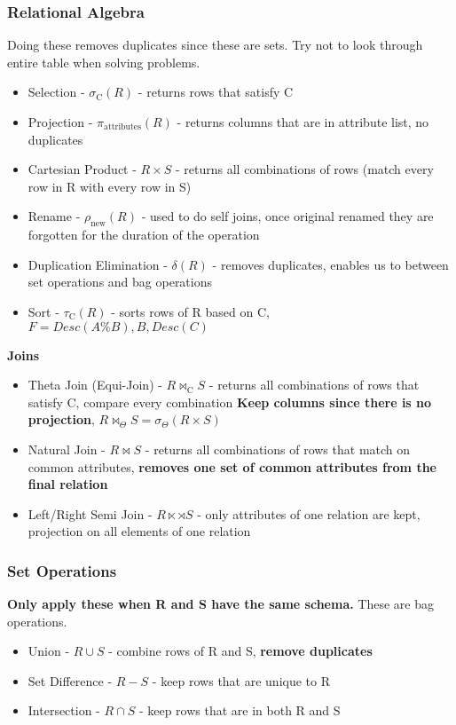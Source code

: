 \documentclass{article}
\begin{document}
\subsubsection*{Relational Algebra}
Doing these removes duplicates since these are sets. Try not to look through
entire table when solving problems.
\begin{itemize}
    \item Selection - $\sigma_{\text{C}}(R)$ - returns rows that satisfy C
    \item Projection - $\pi_{\text{attributes}}(R)$ - returns columns that are
    in attribute list, no duplicates
    \item Cartesian Product - $R \times S$ - returns all combinations of rows 
    (match every row in R with every row in S)
    \item Rename - $\rho_{\text{new}}(R)$ - used to do self joins, once original 
    renamed they are forgotten for the duration of the operation
    \item Duplication Elimination - $\delta(R)$ - removes duplicates, enables us
    to between set operations and bag operations
    \item Sort - $\tau_{\text{C}}(R)$ - sorts rows of R based on C, $F=Desc(A 
    \% B),B,Desc(C)$
\end{itemize}

\textbf{Joins}
\begin{itemize}
    \item Theta Join (Equi-Join) - $R \bowtie_{\text{C}} S$ - returns all 
    combinations of rows that satisfy C, compare every combination \textbf{Keep
    columns since there is no projection}, $R \bowtie_{\Theta} S = 
    \sigma_{\Theta}(R \times S)$
    \item Natural Join - $R \bowtie S$ - returns all combinations of rows that
    match on common attributes, \textbf{removes one set of common attributes
    from the final relation}
    \item Left/Right Semi Join - $R \ltimes \rtimes S$ - only attributes of one relation
    are kept, projection on all elements of one relation
\end{itemize}

\subsubsection*{Set Operations}
\textbf{Only apply these when R and S have the same schema.} These are bag
operations.
\begin{itemize}
    \item Union - $R \cup S$ - combine rows of R and S, 
    \textbf{remove duplicates}
    \item Set Difference - $R - S$ - keep rows that are unique to R
    \item Intersection - $R \cap S$ - keep rows that are in both R and S
\end{itemize}
\end{document}

